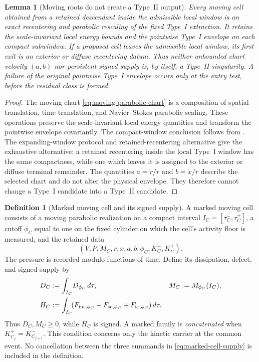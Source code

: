 \documentclass[11pt]{amsart}
\numberwithin{equation}{section}
\theoremstyle{plain}
\newtheorem{lemma}[lemma]{Lemma}
\theoremstyle{definition}
\newtheorem{definition}[definition]{Definition}
\theoremstyle{remark}
\begin{document}
\begin{lemma}[Moving roots do not create a Type~II output]
\label{lem:moving-roots-remain-typeI}
Every moving cell obtained from a retained descendant inside the admissible
local window is an exact recentering and parabolic rescaling of the fixed
Type~I extraction.  It retains the scale-invariant local energy bounds and the
pointwise Type~I envelope on each compact subwindow.  If a proposed cell leaves
the admissible local window, its first exit is an exterior or diffuse
recentering datum.  Thus neither unbounded chart velocity \((a,b)\) nor
persistent signed supply is, by itself, a Type~II singularity.  A failure of
the original pointwise Type~I envelope occurs only at the entry test, before
the residual class is formed.
\end{lemma}

\begin{proof}
The moving chart \eqref{eq:moving-parabolic-chart} is a composition of spatial
translation, time translation, and Navier--Stokes parabolic scaling.  These
operations preserve the scale-invariant local energy quantities and transform
the pointwise envelope covariantly.  The compact-window conclusion follows
from .  The expanding-window
protocol and retained-recentering alternative
give the exhaustive alternative: a retained recentering inside the local
Type~I window has the same compactness, while one which leaves it is assigned
to the exterior or diffuse terminal remainder.  The quantities
\(a=\dot r/r\) and \(b=\dot x/r\) describe the selected chart and do not alter
the physical envelope.  They therefore cannot change a Type~I candidate into
a Type~II candidate.
\end{proof}

\begin{definition}[Marked moving cell and its signed supply]
\label{def:compatible-marked-cell-family}
A marked moving cell consists of a moving parabolic realization on a compact
interval \(I_C=[\tau_C^-,\tau_C^+]\), a cutoff \(\phi_C\) equal to one on the
fixed cylinder on which the cell's activity floor is measured, and the retained
data
\[
 (V,P,M_C,r,x,a,b,\phi_C,K_C^-,K_C^+).
\]
The pressure is recorded modulo functions of time.  Define its dissipation,
defect, and signed supply by
\begin{align}
 D_C&:=\int_{I_C}\!D_{\phi_C}\,d\tau,&
 M_C&:=M_{\phi_C}(I_C),\label{eq:marked-cell-cost}\\
 H_C&:=\int_{I_C}\!
   (F_{{\rm int},\phi_C}+F_{{\rm sc},\phi_C}
       +F_{{\rm tr},\phi_C})\,d\tau .
 \label{eq:marked-cell-supply}
\end{align}
Thus \(D_C,M_C\ge0\), while \(H_C\) is signed.  A marked family is
\emph{concatenated} when \(K_{C_j}^+=K_{C_{j+1}}^-\).  This condition concerns
only the kinetic carrier at the common event.  No cancellation between the
three summands in \eqref{eq:marked-cell-supply} is included in the definition.
\end{definition}
\end{document}
